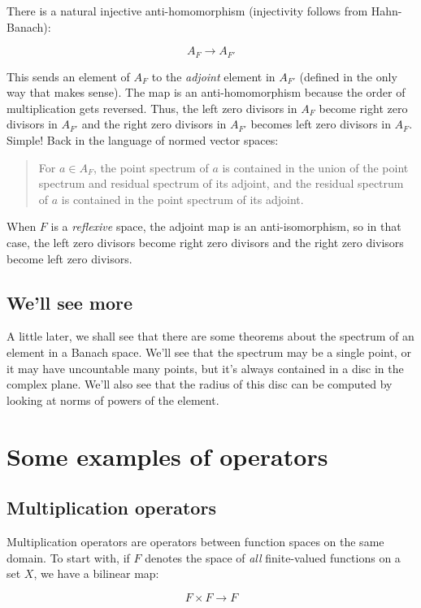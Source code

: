 \documentclass[a4paper]{amsart}
\begin{document}
There is a natural injective anti-homomorphism (injectivity follows
from Hahn-Banach):

$$A_F \to A_{F'}$$

This sends an element of $A_F$ to the {\em adjoint} element in
$A_{F'}$ (defined in the only way that makes sense). The map is an
anti-homomorphism because the order of multiplication gets
reversed. Thus, the left zero divisors in $A_F$ become right zero
divisors in $A_{F'}$ and the right zero divisors in $A_{F'}$ becomes
left zero divisors in $A_F$. Simple! Back in the language of normed vector spaces:

\begin{quote}
  For $a \in A_F$, the point spectrum of $a$ is contained in the union
  of the point spectrum and residual spectrum of its adjoint, and the
  residual spectrum of $a$ is contained in the point spectrum of its
  adjoint.
\end{quote}

When $F$ is a {\em reflexive} space, the adjoint map is an
anti-isomorphism, so in that case, the left zero divisors become right
zero divisors and the right zero divisors become left zero divisors.

\subsection{We'll see more}

A little later, we shall see that there are some theorems about the
spectrum of an element in a Banach space. We'll see that the spectrum
may be a single point, or it may have uncountable many points, but
it's always contained in a disc in the complex plane. We'll also see
that the radius of this disc can be computed by looking at norms of
powers of the element.

\section{Some examples of operators}

\subsection{Multiplication operators}

Multiplication operators are operators between function spaces on the
same domain. To start with, if $F$ denotes the space of {\em all}
finite-valued functions on a set $X$, we have a bilinear map:

$$F \times F \to F$$
\end{document}
